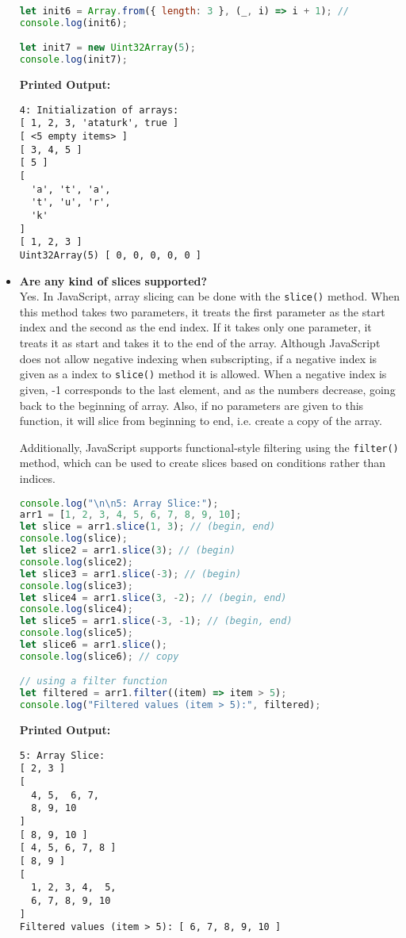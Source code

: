 \documentclass{article}
\begin{document}
\begin{itemize}
\begin{lstlisting}[language=JavaScript]
let init6 = Array.from({ length: 3 }, (_, i) => i + 1); // 
console.log(init6);

let init7 = new Uint32Array(5);
console.log(init7);
\end{lstlisting}
\textbf{Printed Output:}
\begin{verbatim}
4: Initialization of arrays:
[ 1, 2, 3, 'ataturk', true ]
[ <5 empty items> ]
[ 3, 4, 5 ]
[ 5 ]
[
  'a', 't', 'a',
  't', 'u', 'r',
  'k'
]
[ 1, 2, 3 ]
Uint32Array(5) [ 0, 0, 0, 0, 0 ]
\end{verbatim}


\item \textbf{Are any kind of slices supported?} \\
Yes. In JavaScript, array slicing can be done with the \texttt{slice()} method. When this method takes two parameters, it treats the first parameter as the start index and the second as the end index. If it takes only one parameter, it treats it as start and takes it to the end of the array. Although JavaScript does not allow negative indexing when subscripting, if a negative index is given as a index to \texttt{slice()} method it is allowed. When a negative index is given, -1 corresponds to the last element, and as the numbers decrease, going back to the beginning of array. Also, if no parameters are given to this function, it will slice from beginning to end, i.e. create a copy of the array.

Additionally, JavaScript supports functional-style filtering using the \texttt{filter()} method, which can be used to create slices based on conditions rather than indices.
\begin{lstlisting}[language=JavaScript]
console.log("\n\n5: Array Slice:");
arr1 = [1, 2, 3, 4, 5, 6, 7, 8, 9, 10];
let slice = arr1.slice(1, 3); // (begin, end)
console.log(slice); 
let slice2 = arr1.slice(3); // (begin)
console.log(slice2);
let slice3 = arr1.slice(-3); // (begin)
console.log(slice3); 
let slice4 = arr1.slice(3, -2); // (begin, end)
console.log(slice4);
let slice5 = arr1.slice(-3, -1); // (begin, end)
console.log(slice5);
let slice6 = arr1.slice();
console.log(slice6); // copy

// using a filter function
let filtered = arr1.filter((item) => item > 5);
console.log("Filtered values (item > 5):", filtered);
\end{lstlisting}
\textbf{Printed Output:}
\begin{verbatim}
5: Array Slice:
[ 2, 3 ]
[
  4, 5,  6, 7,
  8, 9, 10
]
[ 8, 9, 10 ]
[ 4, 5, 6, 7, 8 ]
[ 8, 9 ]
[
  1, 2, 3, 4,  5,
  6, 7, 8, 9, 10
]
Filtered values (item > 5): [ 6, 7, 8, 9, 10 ]
\end{verbatim}




\end{itemize}
\end{document}
